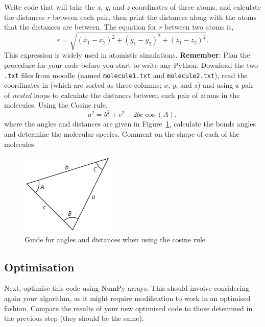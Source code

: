 \documentclass[a4paper]{article}
\begin{document}
Write code that will take the \emph{x}, \emph{y}, and \emph{z} coordinates of three atoms, and calculate the distances $r$ between each pair, then print the distances along with the atoms that the distances are between.
The equation for $r$ between two atoms is,
\begin{equation}
	r = \sqrt{(x_1 - x_2)^2 + (y_1 - y_2)^2 + (z_1 - z_2)^2}.
\end{equation}
This expression is widely used in atomistic simulations.
\textbf{Remember}: Plan the procedure for your code before you start to write any Python.
Download the two \texttt{.txt} files from moodle (named \texttt{molecule1.txt} and \texttt{molecule2.txt}), read the coordinates in (which are sorted as three columns; $x$, $y$, and $z$) and using a pair of \emph{nested} loops to calculate the distances between each pair of atoms in the molecules.
Using the Cosine rule,
%
\begin{equation}
  a^2 = b^2 + c^2 -2bc\cos(A),
\end{equation}
%
where the angles and distances are given in Figure~\ref{fig:cosine}, calculate the bonds angles and determine the molecular species.
Comment on the shape of each of the molecules.
%
\begin{figure}[t]
\centering
\includegraphics[width=0.4\textwidth]{triangle}
\caption{\label{fig:cosine} Guide for angles and distances when using the cosine rule.}
\end{figure}
%

\subsection{Optimisation}

Next, optimise this code using NumPy arrays.
This should involve considering again your algorithm, as it might require modification to work in an optimised fashion.
Compare the results of your new optimised code to those detemined in the previous step (they should be the same).



\end{document}
